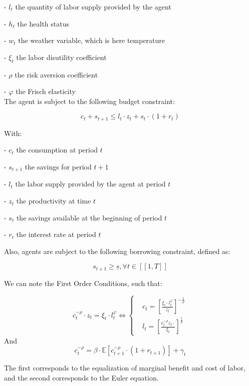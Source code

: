 \documentclass{article}
\begin{document}
-  $l_{t}$  the quantity of labor supply provided by the agent

-  $h_{t}$  the health status

-  $w_{t}$  the weather variable, which is here temperature

-  $\xi_{t}$ the labor disutility coefficient

- $\rho$ the risk aversion coefficient

- $\varphi$ the Frisch elasticity
\\

The agent is subject to the following budget constraint:

$$c_{t} + s_{t+1} \leq l_{t}\cdot z_{t} + s_{t}\cdot(1+r_{t})$$

With: 

-  $c_t$ the consumption at period $t$

-  $s_{t+1}$ the savings for period $t+1$

-  $l_t$ the labor supply provided by the agent at period $t$

-  $z_t$ the productivity at time $t$

-  $s_{t}$ the savings available at the beginning of period $t$

-  $r_{t}$ the interest rate at period $t$

Also, agents are subject to the following borrowing constraint, defined as: 

$$s_{t+1}\geq \underline{s}, \forall t \in [\![1,T]\!]$$


We can note the First Order Conditions, such that: 

\begin{equation}
    c^{-\rho}_{t}\cdot z_{t} = \xi_{t}\cdot l_{t}^{\varphi} \iff
        \begin{cases}
        & c_t = \left[\frac{\xi_{t}\cdot l_{t}^{\varphi}}{z_{t}}\right]^{-\frac{1}{\rho}}\\ 
        & l_{t} = \left[\frac{c_{t}^{-\rho}z_{t}\cdot}{\xi_{t}}\right]^{\frac{1}{\rho}}
    \end{cases}
\end{equation}
And 
\begin{equation}
    c^{-\rho}_{t} = \beta \cdot \mathbb{E}\left[c^{-\rho}_{t+1}\cdot (1+r_{t+1})\right] + \gamma_{t}
\end{equation}

The first corresponds to the equalization of marginal benefit and
cost of labor, and the second corresponds to the Euler equation.
\end{document}

